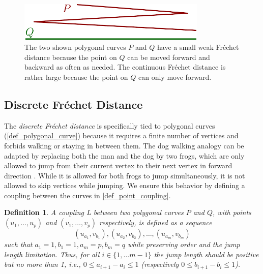 \documentclass[
oneside,
fontsize=11pt
]{scrartcl}
\newtheorem{mydef}{Definition}
\begin{document}
\begin{figure}[ht]
  \centering
  \includegraphics[width=0.8\textwidth]{images/frechet_distance/weak-frechet-distance-example.pdf}
  \caption{
    The two shown polygonal curves $P$ and $Q$ have a small weak Fréchet distance 
    because the point on $Q$ can be moved forward and backward as often as needed. 
    The continuous Fréchet distance is rather large 
    because the point on $Q$ can only move forward.}
  \label{fig_weak_frechet_distance}
\end{figure}



\subsection{Discrete Fréchet Distance}
The \textit{discrete Fréchet distance} is specifically tied to 
polygonal curves (\autoref{def_polygonal_curve}) 
because it requires a finite number of vertices 
and forbids walking or staying in between them.
The dog walking analogy can be adapted by replacing both the man and the dog by two frogs,
which are only allowed to jump from their current vertex to their next 
vertex in forward direction \cite{bringmann_why_2014}.
While it is allowed for both frogs to jump simultaneously,
it is not allowed to skip vertices while jumping. 
We ensure this behavior by defining a coupling between the curves in \autoref{def_point_coupling}.

\begin{mydef}
  \label{def_point_coupling}
  A \textit{coupling} L between two polygonal curves $P$ and $Q$, 
  with points $(u_1, \dots, u_p)$ and $(v_1, \dots, v_p)$ respectively, 
  is defined as a sequence
  $$(u_{a_1}, v_{b_1}),(u_{a_2}, v_{b_2}), \dots, (u_{a_m}, v_{b_m})$$
  such that $a_1 = 1, b_1 = 1, a_m = p, b_m = q$ 
  while preserving order and the jump length limitation.
  Thus, for all $i \in \{1, \dots m-1\}$
  the jump length should be positive but no more than 1,
  i.e., $0 \leq a_{i+1} - a_i \leq 1$ (respectively $0 \leq b_{i+1} - b_i \leq 1$).
\end{mydef}
\end{document}
